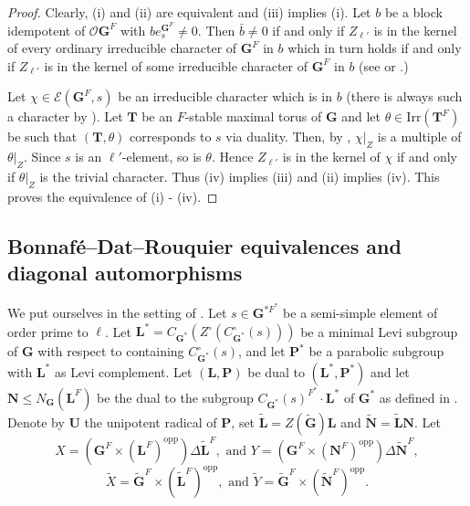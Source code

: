 \documentclass{amsart}
\theoremstyle{plain}\newtheorem{Theorem}{Theorem}[section]
\theoremstyle{plain}\newtheorem{Conjecture}[Theorem]{Conjecture}
\theoremstyle{plain}\newtheorem{Corollary}[Theorem]{Corollary}
\theoremstyle{plain}\newtheorem{Lemma}[Theorem]{Lemma}
\theoremstyle{plain}\newtheorem{Proposition}[Theorem]{Proposition}
\theoremstyle{definition}\newtheorem{Definition}[Theorem]{Definition}
\theoremstyle{definition}\newtheorem{Example}[Theorem]{Example}
\theoremstyle{definition}\newtheorem{Examples}[Theorem]{Examples}
\theoremstyle{definition}\newtheorem{Exercise}[Theorem]{Exercise}
\theoremstyle{definition}\newtheorem{Notation}[Theorem]{Notation}
\theoremstyle{definition}\newtheorem{Remark}[Theorem]{Remark}
\theoremstyle{definition}\newtheorem{Remarks}[Theorem]{Remarks}
\def\CO{{\mathcal{O}}}    \def\OPE{{\mathcal{O}(P\rtimes E)}}
\def\Irr{\mathrm{Irr}}           \def\tenK{\otimes_K}
\def\opp{\mathrm{opp}}
\newcommand{\bG}{{\mathbf{G}}}
\newcommand{\bL}{{\mathbf{L}}}
\newcommand{\bN}{{\mathbf{N}}}
\newcommand{\bP}{{\mathbf{P}}}
\newcommand{\bT}{{\mathbf{T}}}
\newcommand{\bU}{{\mathbf{U}}}
\numberwithin{equation}{section}
\begin{document}
\begin{proof}  Clearly, (i)  and  (ii)  are equivalent  and  (iii) implies (i).   
Let $b $ be a block idempotent  of $\CO \bG^F $  with   $be_s^{\bG^F} \ne 0$. Then  $\bar b \ne 0 $ if and only if $Z_{\ell'} $ is in the kernel   of every ordinary  irreducible  character of $\bG^F$  in $b$ which in turn holds   if and only if   $Z_{\ell'}$  is  in the kernel of  some irreducible  character  of  $\bG^F$ in $b$ (see \cite[Ch.~5, Thm.~8.8]{NT} or \cite[Lem.~2.10]{FK}.)

Let   $\chi \in {\mathcal E}(\bG^F , s)$ be  an irreducible character  which is in $b$ (there is always  such a character by \cite[Thm.~9.12]{CaEnbook}). Let   $\bT $ be  an $F$-stable maximal  torus  of $\bG$ and let $\theta \in \Irr(\bT^F) $ be  such that $(\bT, \theta)$  corresponds to $s$ via duality.
 Then, by \cite[Lem.~2.2]{MaHeight},   $\chi|_Z $ is  a  multiple  of  $\theta|_Z$.   Since $s$  is an $\ell'$-element, so is $\theta $. Hence   $Z_{\ell'} $ is in the kernel of $\chi$ if and only if   $\theta|_Z$  is the trivial character.   Thus (iv) implies (iii)  and (ii) implies  (iv). This proves the equivalence of (i) - (iv). 
 \end{proof}



  \subsection{Bonnaf\'e--Dat--Rouquier equivalences and diagonal automorphisms}\label{subsec:extenddiagonal} We put ourselves in the setting of \cite[Sec.~7]{BDR}.  Let    $s \in \bG^{*F^*}$ be a semi-simple element of  order prime to $\ell $. Let $\bL^* =C_{\bG^*}(Z^{\circ} (C^{\circ}_{\bG^*} (s)) )$  be a  minimal   Levi subgroup  of $\bG$  with respect to containing $C^{\circ}_{\bG^*} (s)$, and let $\bP^*$ be a  parabolic subgroup with $\bL^*$ as Levi complement.  
Let $(\bL, \bP )$  be dual  to $(\bL^*, \bP^* )$  and let  $\bN \leq N_{\bG} (\bL^F) $ be the  dual  to the subgroup $C_{\bG^*}(s) ^{F^*}\cdot\bL^*$  of $\bG^*$ as defined  in \cite[ Sec.~7A]{BDR}.   Denote by $\bU$
 the unipotent radical of   $\bP$, set $\tilde \bL  =  Z(\tilde \bG)  \bL$ and $\tilde \bN =  \tilde \bL \bN$.   Let   $$X  =  (\bG^F \times (\bL^F)^{\opp} )\Delta \tilde \bL^F ,   \text{ and }    Y= (\bG^F  \times  (\bN^{F})^{\opp} ) \Delta \tilde \bN^F,$$
   $$\tilde X=  \tilde\bG^F \times (\tilde \bL^F)^{\opp},   \text{ and }   \tilde  Y= \tilde \bG^F  \times  (\tilde \bN^F)^{\opp}. $$
 
\end{document}
